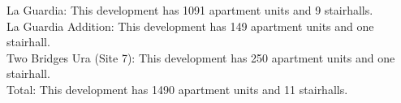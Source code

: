 {La Guardia}: This development has 1091 apartment units and 9 stairhalls.\\{La Guardia Addition}: This development has 149 apartment units and one stairhall.\\{Two Bridges Ura (Site 7)}: This development has 250 apartment units and one stairhall.\\{Total}: This development has 1490 apartment units and 11 stairhalls.\\